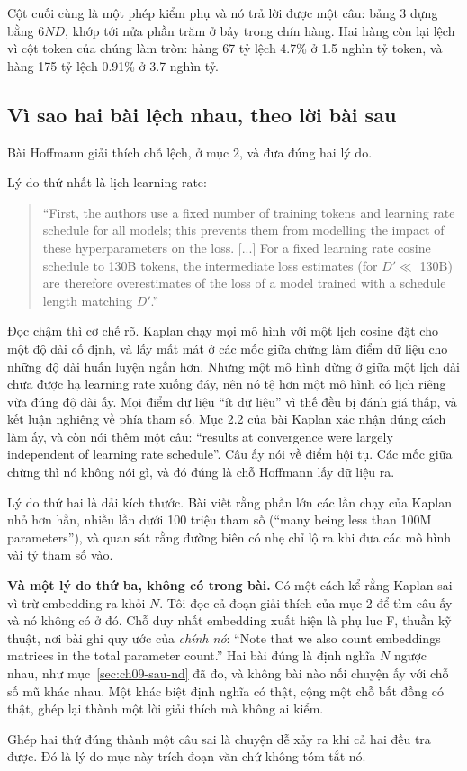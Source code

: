 Cột cuối cùng là một phép kiểm phụ và nó trả lời được một câu: bảng 3 dựng bằng
\(6ND\), khớp tới nửa phần trăm ở bảy trong chín hàng. Hai hàng còn lại lệch vì
cột token của chúng làm tròn: hàng 67 tỷ lệch 4.7\% ở 1.5 nghìn tỷ token, và
hàng 175 tỷ lệch 0.91\% ở 3.7 nghìn tỷ.

\subsection*{Vì sao hai bài lệch nhau, theo lời bài sau}

%
Bài Hoffmann giải thích chỗ lệch, ở mục 2, và đưa đúng hai lý do.

Lý do thứ nhất là lịch learning rate:

\begin{quote}
\enquote{First, the authors use a fixed number of training tokens and learning
rate schedule for all models; this prevents them from modelling the impact of
these hyperparameters on the loss. [...] For a fixed learning rate cosine
schedule to 130B tokens, the intermediate loss estimates (for \(D' \ll\) 130B)
are therefore overestimates of the loss of a model trained with a schedule
length matching \(D'\).}
\end{quote}

Đọc chậm thì cơ chế rõ. Kaplan chạy mọi mô hình với một lịch cosine đặt cho một
độ dài cố định, và lấy mất mát ở các mốc giữa chừng làm điểm dữ liệu cho những
độ dài huấn luyện ngắn hơn. Nhưng một mô hình dừng ở giữa một lịch dài chưa
được hạ learning rate xuống đáy, nên nó tệ hơn một mô hình có lịch riêng vừa
đúng độ dài ấy. Mọi điểm dữ liệu \enquote{ít dữ liệu} vì thế đều bị đánh giá
thấp, và kết luận nghiêng về phía tham số. Mục 2.2 của bài Kaplan xác nhận đúng
cách làm ấy, và còn nói thêm một câu: \enquote{results at convergence were
largely independent of learning rate schedule}. Câu ấy nói về điểm hội tụ. Các
mốc giữa chừng thì nó không nói gì, và đó đúng là chỗ Hoffmann lấy dữ liệu ra.

Lý do thứ hai là dải kích thước. Bài viết rằng phần lớn các lần chạy của Kaplan
nhỏ hơn hẳn, nhiều lần dưới 100 triệu tham số
(\enquote{many being less than 100M parameters}), và quan sát rằng đường biên có
 nhẹ chỉ lộ ra khi đưa các mô hình vài tỷ tham số vào.

\textbf{Và một lý do thứ ba, không có trong bài.} Có một cách kể rằng Kaplan sai
vì trừ embedding ra khỏi \(N\). Tôi đọc cả đoạn giải thích của mục 2 để tìm câu
ấy và nó không có ở đó. Chỗ duy nhất
embedding xuất hiện là phụ lục F, thuần kỹ thuật, nơi bài ghi quy ước của
\emph{chính nó}: \enquote{Note that we also count embeddings matrices in the
total parameter count.} Hai bài đúng là định nghĩa \(N\) ngược nhau, như
mục~\ref{sec:ch09-sau-nd} đã đo, và không bài nào nối chuyện ấy với chỗ số mũ
khác nhau. Một khác biệt định nghĩa có thật, cộng một chỗ bất đồng có thật, ghép
lại thành một lời giải thích mà không ai kiểm.

Ghép hai thứ đúng thành một câu sai là chuyện dễ xảy ra khi cả hai đều tra được.
Đó là lý do mục này trích đoạn văn chứ không tóm tắt nó.
